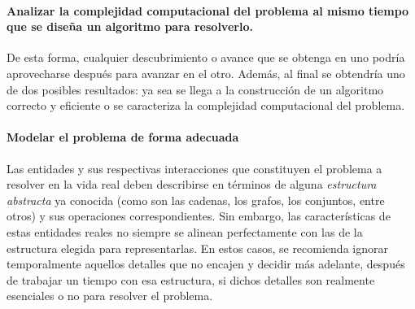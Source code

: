 \paragraph*{Analizar la complejidad computacional del problema al mismo tiempo que se diseña un algoritmo para resolverlo.}{
  De esta forma, cualquier descubrimiento o avance que se obtenga en uno podría aprovecharse después para avanzar en el otro.
  Además, al final se obtendría uno de dos posibles resultados: ya sea se llega a la construcción de un algoritmo correcto y eficiente o se caracteriza la complejidad computacional del problema.
}

\paragraph*{Modelar el problema de forma adecuada}{
  Las entidades y sus respectivas interacciones que constituyen el problema a resolver en la vida real deben describirse en términos de alguna \emph{estructura abstracta} ya conocida (como son las cadenas, los grafos, los conjuntos, entre otros) y sus operaciones correspondientes.
  Sin embargo, las características de estas entidades reales no siempre se alinean perfectamente con las de la estructura elegida para representarlas.
  En estos casos, se recomienda ignorar temporalmente aquellos detalles que no encajen y decidir más adelante, después de trabajar un tiempo con esa estructura, si dichos detalles son realmente esenciales o no para resolver el problema.
}

